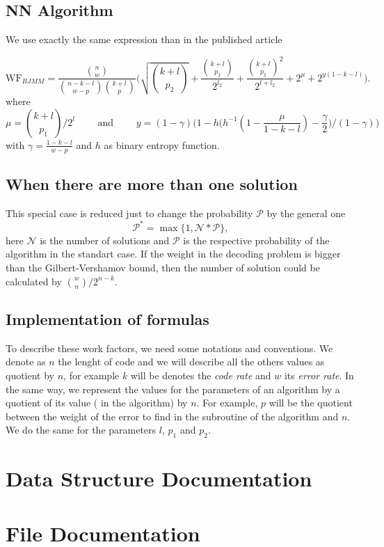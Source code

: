 \documentclass[a4paper]{book}
\newcommand{\WF}{\mathrm{WF}}
\begin{document}
\section{NN Algorithm}
We use exactly the same expression than in the published article

 $$\WF_{BJMM}=\frac{\binom{n}{w}}{\binom{n-k-l}{w-p}\binom{k+l}{p}}\Big( \sqrt{\binom{k+l}{p_2}}  +\frac{\binom{k+l}{p_2}}{ 2^{l_2}} + \frac{\binom{k+l}{p_2}^2}{ 2^{l+l_2}}+ 2^\mu+ 2^{y(1-k-l)}\Big).$$ 
where 
$$\mu=\binom{k+l}{p_1}/2^l \qquad\mbox{ and } \qquad y=(1-\gamma)\Big(1-h\big( h^{-1}(1-\frac{\mu}{1-k-l}) -\frac{\gamma}{2}\big) / (1-\gamma) \Big)$$
with $\gamma=\frac{1-k-l}{w-p}$ and $h$ as binary entropy function.
\section{When there are more than one solution}
This special case is reduced just to change the probability $\mathcal{P}$ by the general one
$$\mathcal{P}^*=\max\{1,\mathcal{N}*\mathcal{P}\},$$
here $\mathcal{N}$ is the number of solutions and $\mathcal{P}$ is the respective probability of the algorithm in the standart case. If the weight in the decoding problem is bigger than the Gilbert-Vershamov bound, then the number of solution could be calculated by $\binom{w}{n}/ 2^{n-k} $. 

\section{Implementation of formulas}

To describe these work factors, we need some notations and conventions. We denote as $n$ the lenght of code and we will describe all the others values as quotient by $n$, for example  $k$ will be denotes the \emph{code rate} and $w$ its \emph{error rate}. In the same way, we represent the values for the parameters of an algorithm by a quotient of its value ( in the algorithm) by $n$. For example, $p$ will be the quotient between the weight of the error to find in the subroutine of the algorithm and $n$. We do the same for the parameters $l$, $p_1$ and $p_2$.

\chapter{\-Data \-Structure \-Documentation}

\chapter{\-File \-Documentation}




















\printindex
\end{document}
